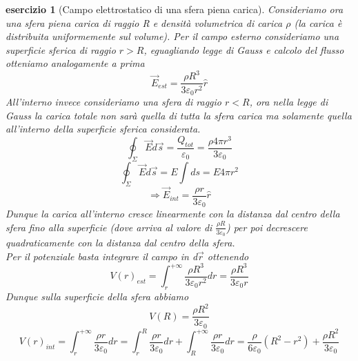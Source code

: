\documentclass[10pt,a4paper]{article}
\newtheorem{esercizio}{esercizio}
\begin{document}
\begin{esercizio}[Campo elettrostatico di una sfera piena carica]
Consideriamo ora una sfera piena carica di raggio R e densità volumetrica di carica $\rho$ (la carica è distribuita uniformemente sul volume). Per il campo esterno consideriamo una superficie sferica di raggio \(r>R\), eguagliando legge di Gauss e calcolo del flusso otteniamo analogamente a prima 
\[\vec{E}_{est} = \frac{\rho R^3}{3 \varepsilon_0 r^2}\hat{r}\]
All'interno invece consideriamo una sfera di raggio \(r<R\), ora nella legge di Gauss la carica totale non sarà quella di tutta la sfera carica ma solamente quella all'interno della superficie sferica considerata. 
\[\oint_{\Sigma}\vec{E}d\vec{s}=\frac{Q_{tot}}{\varepsilon_0} = \frac{\rho 4 \pi r^3}{3\varepsilon_0}\]
\[\oint_{\Sigma}\vec{E}d\vec{s}=E\int ds = E 4\pi r^2\]
\[\Rightarrow \vec{E}_{int} = \frac{\rho r}{3 \varepsilon_0}\hat{r}\]
Dunque la carica all'interno cresce linearmente con la distanza dal centro della sfera fino alla superficie (dove arriva al valore di \(\frac{\rho R}{3 \varepsilon_0}\)) per poi decrescere quadraticamente con la distanza dal centro della sfera.\\
Per il potenziale basta integrare il campo in d$\vec{r}$ ottenendo
\[V(r)_{est} = \int_{r}^{+\infty} \frac{\rho R^3}{3 \varepsilon_0 r^2}dr = \frac{\rho R^3}{3 \varepsilon_0 r}\]
Dunque sulla superficie della sfera abbiamo
\[V(R) = \frac{\rho R^2}{3 \varepsilon_0 }\]
\[V(r)_{int} = \int_{r}^{+\infty} \frac{\rho r}{3 \varepsilon_0} dr = \int_{r}^{R}\frac{\rho r}{3 \varepsilon_0} dr+\int_{R}^{+\infty}\frac{\rho r}{3 \varepsilon_0} dr =\frac{\rho}{6\varepsilon_0}\left(R^2-r^2\right) +\frac{\rho R^2}{3 \varepsilon_0 }\]
\end{esercizio}
\end{document}
